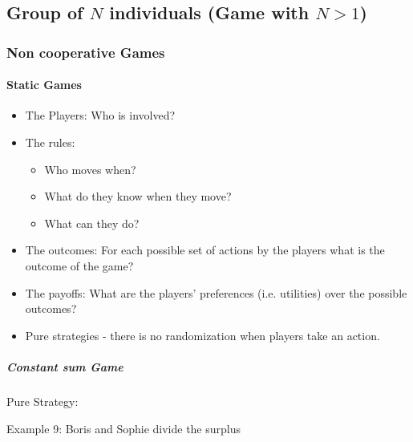 \subsection{Group of $N$ individuals (Game with $N>1$)}

\subsubsection{Non cooperative Games}

\paragraph{Static Games}

\begin{itemize}
    \item The Players:
        Who is involved?
    \item The rules:
        \begin{itemize}
            \item Who moves when?
            \item What do they know when they move?
            \item What can they do?
        \end{itemize}
    \item The outcomes: For each possible set of actions by the players what
        is the outcome of the game?
    \item The payoffs: What are the players' preferences (i.e. utilities) over
        the possible outcomes?
    \item Pure strategies - there is no randomization when players take an action.
\end{itemize}

\subparagraph{Constant sum Game}

Pure Strategy:

Example 9: Boris and Sophie divide the surplus

